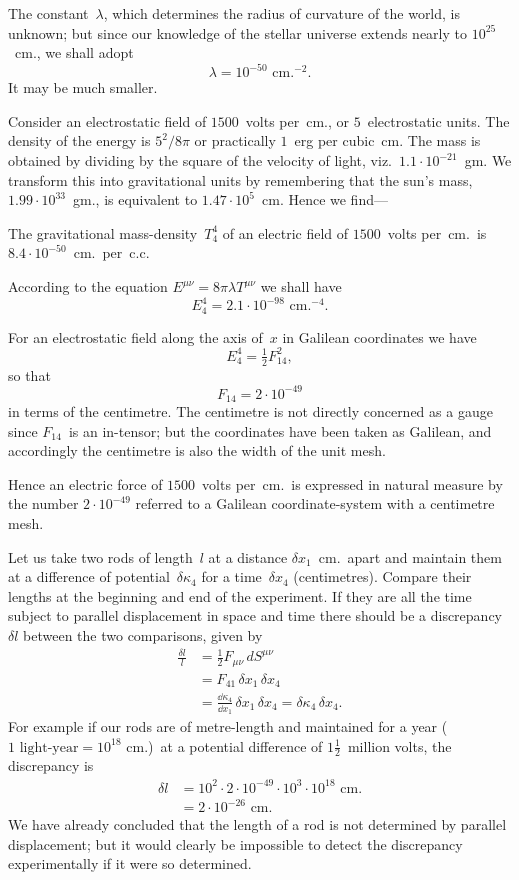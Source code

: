 \documentclass[12pt]{book}
\begin{document}
The constant~$\lambda$, which determines the radius of curvature of the world, is
unknown; but since our knowledge of the stellar universe extends nearly to
$10^{25}$~cm., we shall adopt
\[
\lambda = 10^{-50} \text{ cm.}^{-2}.
\]
It may be much smaller.

Consider an electrostatic field of $1500$~volts per~cm., or $5$~electrostatic units.
The density of the energy is $5^{2}/8\pi$ or practically $1$~erg per cubic~cm. The
mass is obtained by dividing by the square of the velocity of light, viz.\
$1.1 \cdot 10^{-21}$~gm. We transform this into gravitational units by remembering
that the sun's mass, $1.99 \cdot 10^{33}$~gm., is equivalent to $1.47 \cdot 10^{5}$~cm. Hence we
find---

The gravitational mass-density~$T_{4}^{4}$ of an electric field of $1500$~volts
per~cm.\ is $8.4 \cdot 10^{-50}$~cm.\ per~c.c.

According to the equation $E^{\mu\nu} = 8\pi\lambda T^{\mu\nu}$ we shall have
\[
E_{4}^{4} = 2.1 \cdot 10^{-98} \text{ cm.}^{-4}.
\]

For an electrostatic field along the axis of~$x$ in Galilean coordinates we
have
\[
E_{4}^{4} = \tfrac{1}{2} F_{14}^{2},
\]
so that
\[
F_{14} = 2 \cdot 10^{-49}
\]
in terms of the centimetre. The centimetre is not directly concerned as a
gauge since $F_{14}$~is an in-tensor; but the coordinates have been taken as
Galilean, and accordingly the centimetre is also the width of the unit mesh.

Hence an electric force of $1500$~volts per~cm.\ is expressed in natural
measure by the number $2 \cdot 10^{-49}$ referred to a Galilean coordinate-system with
a centimetre mesh.

Let us take two rods of length~$l$ at a distance $\delta x_{1}$~cm.\ apart and maintain
them at a difference of potential~$\delta\kappa_{4}$ for a time~$\delta x_{4}$ (centimetres). Compare
their lengths at the beginning and end of the experiment. If they are all the
time subject to parallel displacement in space and time there should be a
discrepancy~$\delta l$ between the two comparisons, given by~\Eq{(84.4)}
\begin{align*}
  \frac{\delta l}{l}
  &= \tfrac{1}{2} F_{\mu\nu}\, dS^{\mu\nu} \\
  &= F_{41}\, \delta x_{1}\, \delta x_{4} \\
  &= \frac{\dd\kappa_{4}}{\dd x_{1}}\, \delta x_{1}\, \delta x_{4}
  = \delta\kappa_{4}\, \delta x_{4}.
\end{align*}
For example if our rods are of metre-length and maintained for a year
($1 \text{ light-year} = 10^{18} \text{ cm.}$)\ at a potential difference of $1\frac{1}{2}$~million volts, the
discrepancy is
\begin{align*}
  \delta l &= 10^{2} \cdot 2 \cdot 10^{-49} \cdot 10^{3} \cdot 10^{18} \text{ cm.} \\
  &= 2 \cdot 10^{-26} \text{ cm.}
\end{align*}
We have already concluded that the length of a rod is not determined by
parallel displacement; but it would clearly be impossible to detect the discrepancy
experimentally if it were so determined.
\end{document}
